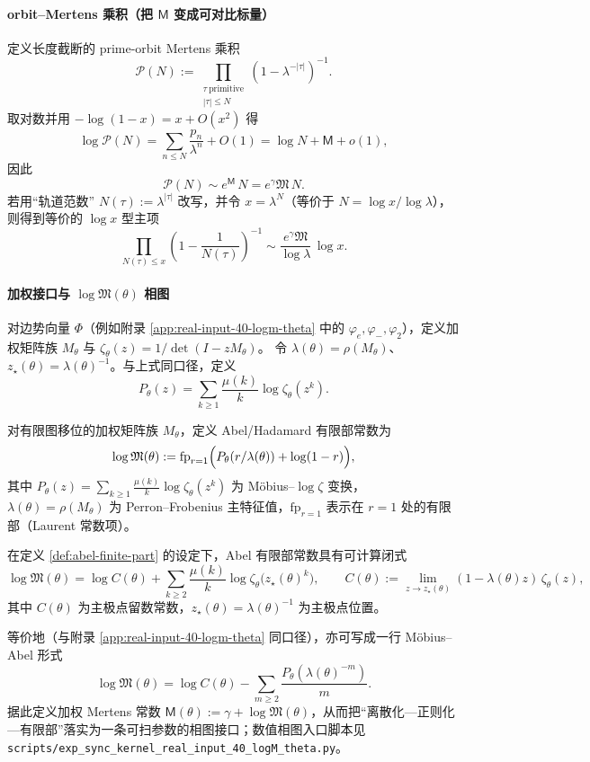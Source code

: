 \paragraph{orbit--Mertens 乘积（把 $\mathsf{M}$ 变成可对比标量）}
定义长度截断的 prime-orbit Mertens 乘积
\[
\mathcal{P}(N):=\prod_{\substack{\tau\ \mathrm{primitive}\\|\tau|\le N}}\left(1-\lambda^{-|\tau|}\right)^{-1}.
\]
取对数并用 $-\log(1-x)=x+O(x^2)$ 得
\[
\log\mathcal{P}(N)=\sum_{n\le N}\frac{p_n}{\lambda^n}+O(1)
=\log N+\mathsf{M}+o(1),
\]
因此
\[
\mathcal{P}(N)\sim e^{\mathsf{M}}\,N=e^{\gamma}\mathfrak{M}\,N.
\]
若用“轨道范数” $N(\tau):=\lambda^{|\tau|}$ 改写，并令 $x=\lambda^N$（等价于 $N=\log x/\log\lambda$），则得到等价的 $\log x$ 型主项
\[
\prod_{N(\tau)\le x}\left(1-\frac{1}{N(\tau)}\right)^{-1}
\sim \frac{e^{\gamma}\mathfrak{M}}{\log\lambda}\,\log x.
\]

\paragraph{加权接口与 \texorpdfstring{$\log\mathfrak{M}(\theta)$}{logM(theta)} 相图}
对边势向量 $\Phi$（例如附录 \ref{app:real-input-40-logm-theta} 中的 $\varphi_e,\varphi_-,\varphi_2$），定义加权矩阵族 $M_\theta$ 与
\(
\zeta_\theta(z)=1/\det(I-zM_\theta)
\)。
令 $\lambda(\theta)=\rho(M_\theta)$、$z_\star(\theta)=\lambda(\theta)^{-1}$。与上式同口径，定义
\[
P_\theta(z)=\sum_{k\ge 1}\frac{\mu(k)}{k}\log\zeta_\theta(z^k).
\]
\begin{definition}\label{def:abel-finite-part}
对有限图移位的加权矩阵族 $M_\theta$，定义 Abel/Hadamard 有限部常数为
\[
\log\mathfrak{M}(\theta):=\mathrm{fp}_{r=1}\Bigl(P_\theta(r/\lambda(\theta))+\log(1-r)\Bigr),
\]
其中 $P_\theta(z)=\sum_{k\ge 1}\frac{\mu(k)}{k}\log\zeta_\theta(z^k)$ 为 Möbius--$\log\zeta$ 变换，$\lambda(\theta)=\rho(M_\theta)$ 为 Perron--Frobenius 主特征值，$\mathrm{fp}_{r=1}$ 表示在 $r=1$ 处的有限部（Laurent 常数项）。
\end{definition}
\begin{proposition}\label{prop:abel-finite-part-mobius-zeta}
在定义 \ref{def:abel-finite-part} 的设定下，Abel 有限部常数具有可计算闭式
\[
\log\mathfrak{M}(\theta)
=\log C(\theta)+\sum_{k\ge 2}\frac{\mu(k)}{k}\log\zeta_\theta\bigl(z_\star(\theta)^k\bigr),
\qquad
C(\theta):=\lim_{z\to z_\star(\theta)}(1-\lambda(\theta)z)\,\zeta_\theta(z),
\]
其中 $C(\theta)$ 为主极点留数常数，$z_\star(\theta)=\lambda(\theta)^{-1}$ 为主极点位置。
\end{proposition}
等价地（与附录 \ref{app:real-input-40-logm-theta} 同口径），亦可写成一行 Möbius--Abel 形式
\[
\log\mathfrak{M}(\theta)=\log C(\theta)-\sum_{m\ge 2}\frac{P_\theta(\lambda(\theta)^{-m})}{m}.
\]
据此定义加权 Mertens 常数
\(
\mathsf{M}(\theta):=\gamma+\log\mathfrak{M}(\theta)
\)，从而把“离散化—正则化—有限部”落实为一条可扫参数的相图接口；数值相图入口脚本见
\texttt{scripts/exp\_sync\_kernel\_real\_input\_40\_logM\_theta.py}。

